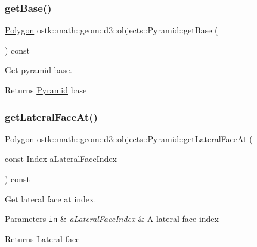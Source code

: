 \subsubsection{\texorpdfstring{get\+Base()}{getBase()}}
{\footnotesize\ttfamily \hyperlink{classostk_1_1math_1_1geom_1_1d3_1_1objects_1_1_polygon}{Polygon} ostk\+::math\+::geom\+::d3\+::objects\+::\+Pyramid\+::get\+Base (\begin{DoxyParamCaption}{ }\end{DoxyParamCaption}) const}



Get pyramid base. 

\begin{DoxyReturn}{Returns}
\hyperlink{classostk_1_1math_1_1geom_1_1d3_1_1objects_1_1_pyramid}{Pyramid} base 
\end{DoxyReturn}
\mbox{\label{classostk_1_1math_1_1geom_1_1d3_1_1objects_1_1_pyramid_a5c29f2b5915fbcf7a200b49840805c86}} 
\subsubsection{\texorpdfstring{get\+Lateral\+Face\+At()}{getLateralFaceAt()}}
{\footnotesize\ttfamily \hyperlink{classostk_1_1math_1_1geom_1_1d3_1_1objects_1_1_polygon}{Polygon} ostk\+::math\+::geom\+::d3\+::objects\+::\+Pyramid\+::get\+Lateral\+Face\+At (\begin{DoxyParamCaption}\item[{const Index}]{a\+Lateral\+Face\+Index }\end{DoxyParamCaption}) const}



Get lateral face at index. 


\begin{DoxyParams}[1]{Parameters}
\mbox{\tt in}  & {\em a\+Lateral\+Face\+Index} & A lateral face index \\
\hline
\end{DoxyParams}
\begin{DoxyReturn}{Returns}
Lateral face 
\end{DoxyReturn}
\mbox{\label{classostk_1_1math_1_1geom_1_1d3_1_1objects_1_1_pyramid_af853f40f9b9501c7fcad30337d646c4c}} 
